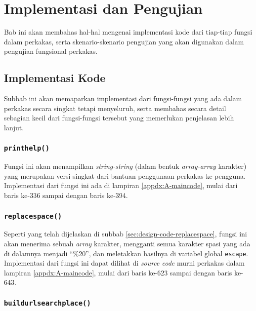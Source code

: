 \chapter{Implementasi dan Pengujian}
\label{chap:testing}

Bab ini akan membahas hal-hal mengenai implementasi kode dari tiap-tiap fungsi dalam perkakas, serta skenario-skenario pengujian yang akan digunakan dalam pengujian fungsional perkakas.

\section{Implementasi Kode}
\label{sec:testing-implementation}

Subbab ini akan memaparkan implementasi dari fungsi-fungsi yang ada dalam perkakas secara singkat tetapi menyeluruh, serta membahas secara detail sebagian kecil dari fungsi-fungsi tersebut yang memerlukan penjelasan lebih lanjut.

\subsection{\texttt{print\textunderscore help()}}
\label{sec:testing-implementation-printhelp}

Fungsi ini akan menampilkan \textit{string-string} (dalam bentuk \textit{array-array} karakter) yang merupakan versi singkat dari bantuan penggunaan perkakas ke pengguna. Implementasi dari fungsi ini ada di lampiran \ref{appdx:A-maincode}, mulai dari baris ke-336 sampai dengan baris ke-394.

\subsection{\texttt{replace\textunderscore space()}}
\label{sec:testing-implementation-replacespace}

Seperti yang telah dijelaskan di subbab \ref{sec:design-code-replacespace}, fungsi ini akan menerima sebuah \textit{array} karakter, mengganti semua karakter spasi yang ada di dalamnya menjadi ``\%20'', dan meletakkan hasilnya di variabel global \verb|escape|. Implementasi dari fungsi ini dapat dilihat di \textit{source code} murni perkakas dalam lampiran \ref{appdx:A-maincode}, mulai dari baris ke-623 sampai dengan baris ke-643.

\subsection{\texttt{build\textunderscore url\textunderscore searchplace()}}
\label{sec:testing-implementation-buildurl-searchplace}

